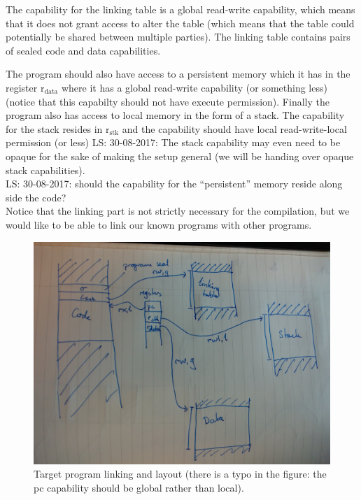 \documentclass[a4paper]{article}
\newcommand\lau[1]{{\color{purple} \sf \footnotesize {LS: #1}}\\}
\newcommand{\rstk}{\mathrm{r}_\mathrm{stk}}
\newcommand{\rdata}{\mathrm{r}_\mathrm{data}}
\begin{document}
The capability for the linking table is a global read-write capability, which means that it does not grant access to alter the table (which means that the table could potentially be shared between multiple parties). The linking table contains pairs of sealed code and data capabilities.

The program should also have access to a persistent memory which it has in the register $\rdata$ where it has a global read-write capability (or something less) (notice that this capabilty should not have execute permission). Finally the program also has access to local memory in the form of a stack. The capability for the stack resides in $\rstk$ and the capability should have local read-write-local permission (or less)
\lau{30-08-2017: The stack capability may even need to be opaque for the sake of making the setup general (we will be handing over opaque stack capabilities).}

\lau{30-08-2017: should the capability for the ``persistent'' memory reside along side the code?}

Notice that the linking part is not strictly necessary for the compilation, but we would like to be able to link our known programs with other programs.

\begin{figure}
  \centering
  \includegraphics[width=\textwidth]{img/prog_layout.jpg}
  \caption{Target program linking and layout (there is a typo in the figure: the pc capability should be global rather than local).}
  \label{fig:trg-prog-link}
\end{figure}
\end{document}
